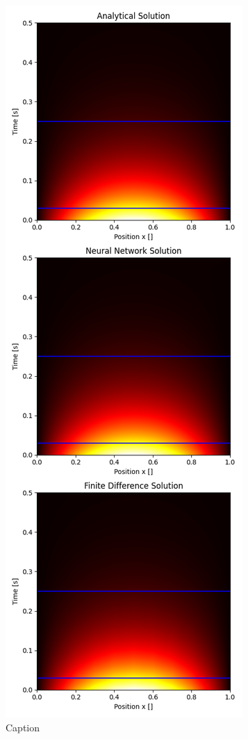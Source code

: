 
\begin{figure}
    \centering
    \includegraphics[width=1.0\linewidth]{project_3/plots/heat_map_comparison.png}
    \caption{Caption}
    \label{fig:enter-label}
\end{figure}

